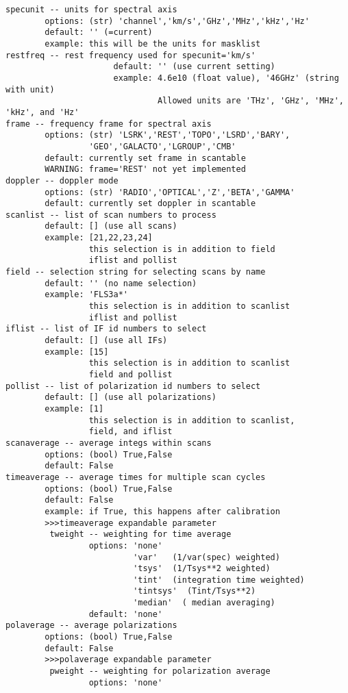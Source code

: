 \begin{verbatim}
specunit -- units for spectral axis
        options: (str) 'channel','km/s','GHz','MHz','kHz','Hz'
        default: '' (=current)
        example: this will be the units for masklist
restfreq -- rest frequency used for specunit='km/s'
                      default: '' (use current setting)
                      example: 4.6e10 (float value), '46GHz' (string with unit)
                               Allowed units are 'THz', 'GHz', 'MHz', 'kHz', and 'Hz'
frame -- frequency frame for spectral axis
        options: (str) 'LSRK','REST','TOPO','LSRD','BARY',
                 'GEO','GALACTO','LGROUP','CMB'
        default: currently set frame in scantable
        WARNING: frame='REST' not yet implemented
doppler -- doppler mode
        options: (str) 'RADIO','OPTICAL','Z','BETA','GAMMA'
        default: currently set doppler in scantable
scanlist -- list of scan numbers to process
        default: [] (use all scans)
        example: [21,22,23,24]
                 this selection is in addition to field
                 iflist and pollist
field -- selection string for selecting scans by name
        default: '' (no name selection)
        example: 'FLS3a*'
                 this selection is in addition to scanlist
                 iflist and pollist
iflist -- list of IF id numbers to select
        default: [] (use all IFs)
        example: [15]
                 this selection is in addition to scanlist
                 field and pollist
pollist -- list of polarization id numbers to select
        default: [] (use all polarizations)
        example: [1]
                 this selection is in addition to scanlist,
                 field, and iflist
scanaverage -- average integs within scans
        options: (bool) True,False
        default: False
timeaverage -- average times for multiple scan cycles
        options: (bool) True,False
        default: False
        example: if True, this happens after calibration
        >>>timeaverage expandable parameter
         tweight -- weighting for time average
                 options: 'none'
                          'var'   (1/var(spec) weighted)
                          'tsys'  (1/Tsys**2 weighted)
                          'tint'  (integration time weighted)
                          'tintsys'  (Tint/Tsys**2)
                          'median'  ( median averaging)
                 default: 'none'
polaverage -- average polarizations
        options: (bool) True,False
        default: False
        >>>polaverage expandable parameter
         pweight -- weighting for polarization average
                 options: 'none'

\end{verbatim}
